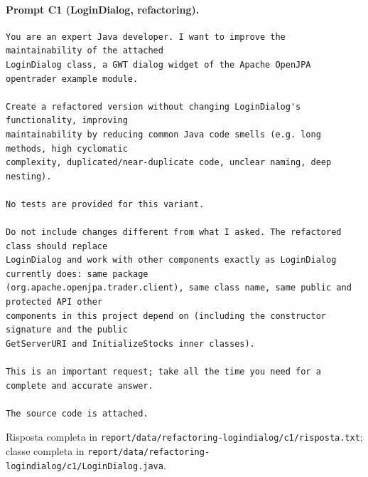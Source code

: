 \paragraph*{Prompt C1 (LoginDialog, refactoring).}
\label{prompt:refactor-ld-c1}
\begin{lstlisting}
You are an expert Java developer. I want to improve the maintainability of the attached
LoginDialog class, a GWT dialog widget of the Apache OpenJPA opentrader example module.

Create a refactored version without changing LoginDialog's functionality, improving
maintainability by reducing common Java code smells (e.g. long methods, high cyclomatic
complexity, duplicated/near-duplicate code, unclear naming, deep nesting).

No tests are provided for this variant.

Do not include changes different from what I asked. The refactored class should replace
LoginDialog and work with other components exactly as LoginDialog currently does: same package
(org.apache.openjpa.trader.client), same class name, same public and protected API other
components in this project depend on (including the constructor signature and the public
GetServerURI and InitializeStocks inner classes).

This is an important request; take all the time you need for a complete and accurate answer.

The source code is attached.
\end{lstlisting}
Risposta completa in \texttt{report/data/refactoring-logindialog/c1/risposta.txt}; classe
completa in \texttt{report/data/refactoring-logindialog/c1/LoginDialog.java}.

